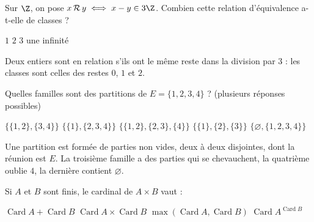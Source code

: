 \begin{question}
Sur $\Z$, on pose $x\,\mathcal{R}\,y \iff x-y\in 3\Z$. Combien cette relation d'équivalence a-t-elle de classes ?
\begin{reponses}
  \mauvaise $1$
  \mauvaise $2$
  \bonne $3$
  \mauvaise une infinité
\end{reponses}
\begin{explication}
Deux entiers sont en relation s'ils ont le même reste dans la division par $3$ : les classes sont celles des restes $0$, $1$ et $2$.
\end{explication}
\end{question}

\begin{question}
Quelles familles sont des partitions de $E=\{1,2,3,4\}$ ? (plusieurs réponses possibles)
\begin{reponses}
  \bonne $\big\{\{1,2\},\{3,4\}\big\}$
  \bonne $\big\{\{1\},\{2,3,4\}\big\}$
  \mauvaise $\big\{\{1,2\},\{2,3\},\{4\}\big\}$
  \mauvaise $\big\{\{1\},\{2\},\{3\}\big\}$
  \mauvaise $\big\{\varnothing,\{1,2,3,4\}\big\}$
\end{reponses}
\begin{explication}
Une partition est formée de parties non vides, deux à deux disjointes, dont la réunion est $E$. La troisième famille a des parties qui se chevauchent, la quatrième oublie $4$, la dernière contient $\varnothing$.
\end{explication}
\end{question}

\begin{question}
Si $A$ et $B$ sont finis, le cardinal de $A\times B$ vaut :
\begin{reponses}
  \mauvaise $\operatorname{Card}A+\operatorname{Card}B$
  \bonne $\operatorname{Card}A\times\operatorname{Card}B$
  \mauvaise $\max(\operatorname{Card}A,\operatorname{Card}B)$
  \mauvaise $\operatorname{Card}A^{\operatorname{Card}B}$
\end{reponses}
\end{question}
